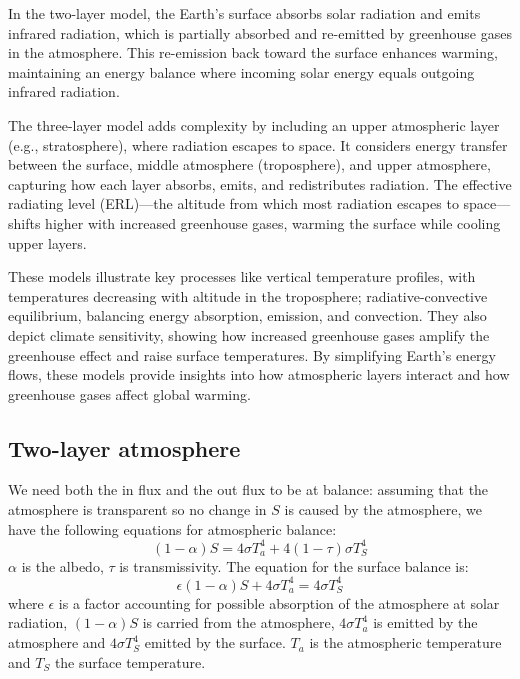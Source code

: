 In the two-layer model, the Earth's surface absorbs solar radiation and emits infrared radiation, which is partially absorbed and re-emitted by greenhouse gases in the atmosphere. This re-emission back toward the surface enhances warming, maintaining an energy balance where incoming solar energy equals outgoing infrared radiation.

The three-layer model adds complexity by including an upper atmospheric layer (e.g., stratosphere), where radiation escapes to space. It considers energy transfer between the surface, middle atmosphere (troposphere), and upper atmosphere, capturing how each layer absorbs, emits, and redistributes radiation. The effective radiating level (ERL)—the altitude from which most radiation escapes to space—shifts higher with increased greenhouse gases, warming the surface while cooling upper layers.


These models illustrate key processes like vertical temperature profiles, with temperatures decreasing with altitude in the troposphere; radiative-convective equilibrium, balancing energy absorption, emission, and convection. They also depict climate sensitivity, showing how increased greenhouse gases amplify the greenhouse effect and raise surface temperatures.
By simplifying Earth's energy flows, these models provide insights into how atmospheric layers interact and how greenhouse gases affect global warming.
\subsection{Two-layer atmosphere}
We need both the in flux and the out flux to be at balance: assuming that the atmosphere is transparent so no change in $S$ is caused by the atmosphere, we have the following equations for atmospheric balance:
\begin{equation}\label{eq.two layer}
	(1-\alpha)S=4\sigma T^4_{a}+4(1-\tau)\sigma T_S^4
\end{equation}
$\alpha$ is the albedo, $\tau$ is transmissivity. The equation for the surface balance is:
\begin{equation}\label{eq.surface balance}
	\epsilon (1-\alpha)S+4\sigma T_a^4=4\sigma T_S^4
\end{equation}
where $\epsilon$ is a factor accounting for possible absorption of the atmosphere at solar radiation, $(1-\alpha)S$  is carried from the atmosphere, $4\sigma T_a^4$ is emitted by the atmosphere and $4\sigma T_S^4$ emitted by the surface.
$T_a$ is the atmospheric temperature and $T_S$ the surface temperature.


